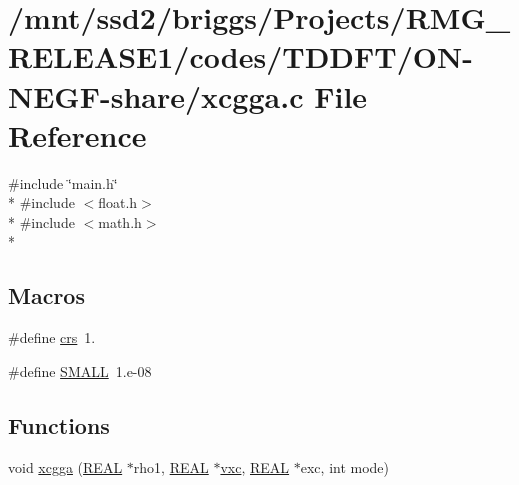 \hypertarget{_t_d_d_f_t_2_o_n-_n_e_g_f-share_2xcgga_8c}{\section{/mnt/ssd2/briggs/\-Projects/\-R\-M\-G\-\_\-\-R\-E\-L\-E\-A\-S\-E1/codes/\-T\-D\-D\-F\-T/\-O\-N-\/\-N\-E\-G\-F-\/share/xcgga.c File Reference}
\label{_t_d_d_f_t_2_o_n-_n_e_g_f-share_2xcgga_8c}
}
{\ttfamily \#include \char`\"{}main.\-h\char`\"{}}\\*
{\ttfamily \#include $<$float.\-h$>$}\\*
{\ttfamily \#include $<$math.\-h$>$}\\*
\subsection*{Macros}
\begin{DoxyCompactItemize}
\item 
\#define \hyperlink{_t_d_d_f_t_2_o_n-_n_e_g_f-share_2xcgga_8c_a9bdd976e97cd44fd0a6d3a22b2d3d0fb}{crs}~1.
\item 
\#define \hyperlink{_t_d_d_f_t_2_o_n-_n_e_g_f-share_2xcgga_8c_a09c78d2f8feb311dd9fc969a0bf84979}{S\-M\-A\-L\-L}~1.e-\/08
\end{DoxyCompactItemize}
\subsection*{Functions}
\begin{DoxyCompactItemize}
\item 
void \hyperlink{_t_d_d_f_t_2_o_n-_n_e_g_f-share_2xcgga_8c_a7c5a03abac2b91305dcbe7e74522b9b3}{xcgga} (\hyperlink{md_8h_a4b654506f18b8bfd61ad2a29a7e38c25}{R\-E\-A\-L} $\ast$rho1, \hyperlink{md_8h_a4b654506f18b8bfd61ad2a29a7e38c25}{R\-E\-A\-L} $\ast$\hyperlink{md_8h_a48f792faf570d41e1d58b4a4e1bce251}{vxc}, \hyperlink{md_8h_a4b654506f18b8bfd61ad2a29a7e38c25}{R\-E\-A\-L} $\ast$exc, int mode)
\end{DoxyCompactItemize}


